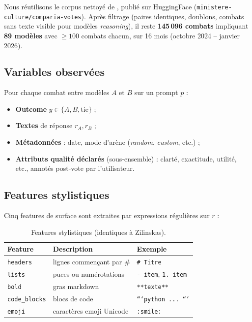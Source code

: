 \documentclass[11pt,a4paper]{article}
\begin{document}
Nous réutilisons le corpus nettoyé de \citet{zilinskas2026formatting}, publié sur
HuggingFace (\texttt{ministere-culture/comparia-votes}). Après filtrage (paires
identiques, doublons, combats sans texte visible pour modèles \emph{reasoning}),
il reste \textbf{145\,096 combats} impliquant \textbf{89 modèles} avec $\geq 100$
combats chacun, sur 16 mois (octobre 2024 -- janvier 2026).

\subsection{Variables observées}

Pour chaque combat entre modèles $A$ et $B$ sur un prompt $p$ :
\begin{itemize}[noitemsep]
  \item \textbf{Outcome} $y \in \{A, B, \text{tie}\}$ ;
  \item \textbf{Textes} de réponse $r_A, r_B$ ;
  \item \textbf{Métadonnées} : date, mode d'arène (\emph{random}, \emph{custom}, etc.) ;
  \item \textbf{Attributs qualité déclarés} (sous-ensemble) : clarté, exactitude,
        utilité, etc., annotés post-vote par l'utilisateur.
\end{itemize}

\subsection{Features stylistiques}

Cinq features de surface sont extraites par expressions régulières sur $r$ :

\begin{table}[H]
\centering
\caption{Features stylistiques (identiques à Zilinskas).}
\label{tab:features}
\begin{tabular}{lll}
\toprule
Feature & Description & Exemple \\
\midrule
\texttt{headers} & lignes commençant par \# & \texttt{\# Titre} \\
\texttt{lists} & puces ou numérotations & \texttt{- item}, \texttt{1. item} \\
\texttt{bold} & gras markdown & \texttt{**texte**} \\
\texttt{code\_blocks} & blocs de code & \texttt{```python ... ```} \\
\texttt{emoji} & caractères emoji Unicode & \texttt{:smile:} \\
\bottomrule
\end{tabular}
\end{table}
\end{document}
